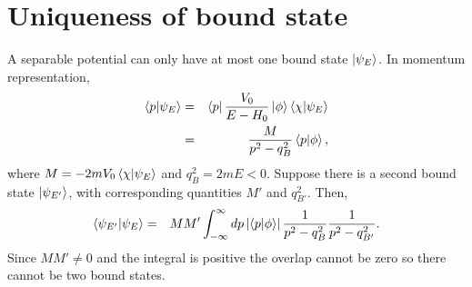 \section{Uniqueness of bound state}
%
A separable potential  can only have at most one bound state $\ket{\psi_{E}}$.
In momentum representation,
%
\begin{eqnarray}
\braket{p}{\psi_{E}}&=&\bra{p}\frac{V_{0}}{E-H_{0}}\ket{\phi}\braket{\chi}{\psi_{E}}
\nonumber \\
&=&\frac{M}{p^{2}-q_{B}^{2}}\braket{p}{\phi},
\end{eqnarray}
%
where $M=-2 m V_{0} \braket{\chi}{\psi_{E}}$ and $q_{B}^2=2 m E<0$. Suppose there is a second bound state $\ket{\psi_{E'}}$,
with corresponding quantities $M'$ and $q_{B'}^2$. Then,
%
\begin{eqnarray}
\braket{\psi_{E'}}{\psi_{E}}&=&M M' \int_{-\infty}^\infty dp \left|\braket{p}{\phi}\right| \frac{1}{p^{2}-q_{B}^{2}}\frac{1}{p^{2}-q_{B'}^{2}}. \nonumber \\		\end{eqnarray}
%
Since $MM'\ne 0$ and the integral is positive the overlap cannot be zero
so there cannot be two bound states.
